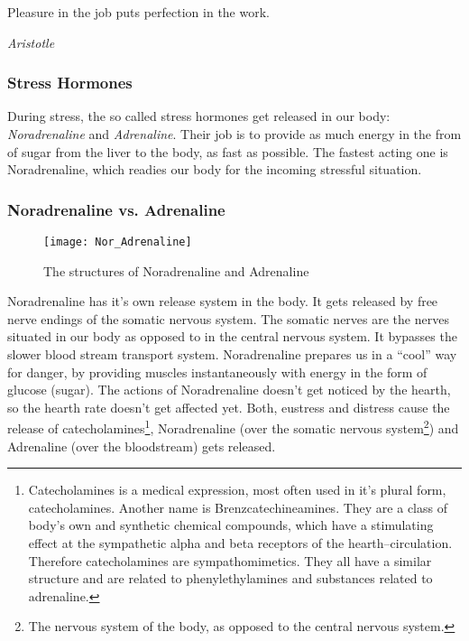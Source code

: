 \documentclass[../Book.Stress_regulation.tex]{subfiles}
\begin{document}
\epigraph{Pleasure in the job puts perfection in the work.}{\textit{Aristotle}}

\subsubsection{Stress Hormones}


During stress, the so called stress hormones get released in our body: \emph{Noradrenaline} and \emph{Adrenaline}.
Their job is to provide as much {energy} in the from of sugar from the liver to the body, as fast as possible.
The fastest acting one is Noradrenaline, which readies our body for the incoming stressful situation.




\subsubsection{Noradrenaline vs. Adrenaline}

\begin{figure}[htb]
\texttt{[image: Nor\_Adrenaline]}
\caption{The structures of Noradrenaline and Adrenaline}
\end{figure}

Noradrenaline has it's {own release system} in the body. It gets released by free nerve endings of the somatic nervous system.
The somatic nerves are the nerves situated in our body as opposed to in the central nervous system.
It bypasses the slower blood stream transport system. Noradrenaline prepares us in a {``cool'' way} for danger, by providing muscles instantaneously with energy in the form of glucose (sugar).
The actions of Noradrenaline doesn't get noticed by the hearth, so the hearth rate doesn't get affected yet.
Both, eustress and distress cause the release of catecholamines\footnote{Catecholamines is a medical expression, most often used in it's plural form, catecholamines. Another name is Brenzcatechineamines. They are a class of body's own and synthetic chemical compounds, which have a stimulating effect at the sympathetic alpha and beta receptors of the hearth--circulation. Therefore catecholamines are sympathomimetics. They all have a similar structure and are related to phenylethylamines and substances related to adrenaline.}, Noradrenaline (over the somatic nervous system\footnote{The nervous system of the body, as opposed to the central nervous system.}) and Adrenaline (over the bloodstream) gets released.
\end{document}

